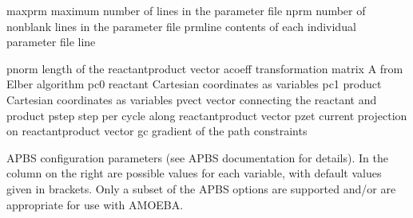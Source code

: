 \documentclass[letterpaper,11pt,english]{sphinxmanual}
\begin{document}

\begin{sphinxVerbatim}[commandchars=\\\{\}]
maxprm          maximum number of lines in the parameter file
nprm            number of nonblank lines in the parameter file
prmline         contents of each individual parameter file line
\end{sphinxVerbatim}


\begin{sphinxVerbatim}[commandchars=\\\{\}]
pnorm           length of the reactant\PYGZhy{}product vector
acoeff          transformation matrix \PYGZsq{}A\PYGZsq{} from Elber algorithm
pc0             reactant Cartesian coordinates as variables
pc1             product Cartesian coordinates as variables
pvect           vector connecting the reactant and product
pstep           step per cycle along reactant\PYGZhy{}product vector
pzet            current projection on reactant\PYGZhy{}product vector
gc              gradient of the path constraints
\end{sphinxVerbatim}


APBS configuration parameters (see APBS documentation for details). In
the column on the right are possible values for each variable, with default
values given in brackets. Only a subset of the APBS options are supported
and/or are appropriate for use with AMOEBA.
\end{document}
